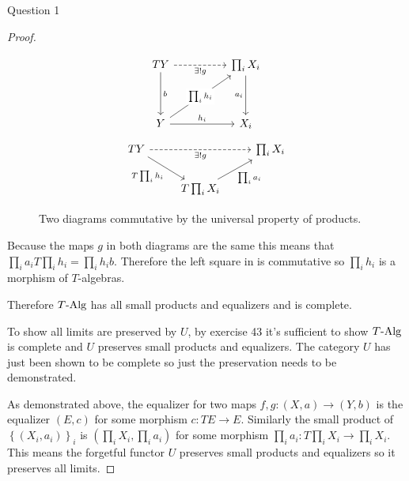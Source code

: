 \documentclass{article}
\newcommand{\set}[1]{\left\{#1\right\}}
\newcommand{\alg}[1]{T\textnormal{-Alg}}
\newenvironment{question}[1][]{\begin{paragraph}{Question #1}}{\end{paragraph}}
\theoremstyle{definition}
\begin{document}
\begin{question}[1]
\begin{enumerate}[(a)]
\begin{proof}
                  \begin{figure}[H]
                      \[
                          \begin{tikzcd}[ampersand replacement=\&]
                              TY \&\& {\prod_{i}X_{i}} \\
                              \\
                              Y \&\& {X_{i}}
                              \arrow["b", from=1-1, to=3-1]
                              \arrow["{\exists!g}"', dashed, from=1-1, to=1-3]
                              \arrow["{a_{i}}"', from=1-3, to=3-3]
                              \arrow["{h_{i}}", from=3-1, to=3-3]
                              \arrow["{\prod_{i}h_{i}}"{description}, from=3-1, to=1-3]
                          \end{tikzcd}
                      \]
                      \[
                          \begin{tikzcd}[ampersand replacement=\&]
                              TY \&\& {\prod_{i}X_{i}} \\
                              \& {T\prod_{i}X_{i}}
                              \arrow["{\exists!g}"', dashed, from=1-1, to=1-3]
                              \arrow["{T\prod_{i}h_{i}}"', from=1-1, to=2-2]
                              \arrow["{\prod_{i}a_{i}}"', from=2-2, to=1-3]
                          \end{tikzcd}
                      \]
                      \caption{Two diagrams commutative by the universal property of products.}
                  \end{figure}
                  Because the maps \(g\) in both diagrams are the same this
                  means that \(\prod_{i}a_{i}T\prod_{i}h_{i}=\prod_{i}h_{i}b\).
                  Therefore the left square in  is commutative
                  so \(\prod_{i}h_{i}\) is a morphism of \(T\)-algebras.

                  Therefore \(\alg{T}\) has all small products and equalizers
                  and is complete.

                  To show all limits are preserved by \(U\), by exercise 43 it's
                  sufficient to show \(\alg{T}\) is complete and \(U\) preserves
                  small products and equalizers. The category \(U\) has just
                  been shown to be complete so just the preservation needs to be
                  demonstrated.

                  As demonstrated above, the equalizer for two maps
                  \(f,g:(X,a)\to(Y,b)\) is the equalizer \((E,c)\) for some
                  morphism \(c:TE\to E\). Similarly the small product of
                  \(\set{(X_{i},a_{i})}_{i}\) is
                  \((\prod_{i}X_{i},\prod_{i}a_{i})\) for some morphism
                  \(\prod_{i}a_{i}:T\prod_{i}X_{i}\to\prod_{i}X_{i}\). This
                  means the forgetful functor \(U\) preserves small products and
                  equalizers so it preserves all limits.
              \end{proof}
    \end{enumerate}
\end{question}
\end{document}
